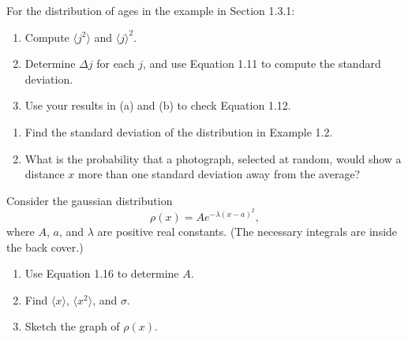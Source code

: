 \documentclass[en, oneside]{vivi}
\begin{document}
\begin{prob}
    For the distribution of ages in the example in Section 1.3.1:
    \begin{enumerate}[label=(\alph*)]
        \item Compute $\langle j^2 \rangle$ and $\langle j \rangle^2$.
        \item Determine $\Delta j$ for each $j$, and use Equation 1.11 to compute the standard deviation.
        \item Use your results in (a) and (b) to check Equation 1.12.
    \end{enumerate}
\end{prob}

\begin{prob}
    \begin{enumerate}[label=(\alph*)]
        \item Find the standard deviation of the distribution in Example 1.2.
        \item What is the probability that a photograph, selected at random, would show a distance $x$ more than one standard deviation away from the average?
    \end{enumerate}
\end{prob}

\begin{prob}
    Consider the gaussian distribution
    \begin{equation*}
        \rho(x) = A e^{-\lambda (x - a)^2},
    \end{equation*}
    where $A$, $a$, and $\lambda$ are positive real constants. (The necessary integrals are inside the back cover.)
    \begin{enumerate}[label=(\alph*)]
        \item Use Equation 1.16 to determine $A$.
        \item Find $\langle x \rangle$, $\langle x^2 \rangle$, and $\sigma$.
        \item Sketch the graph of $\rho(x)$.
    \end{enumerate}
\end{prob}
\end{document}
